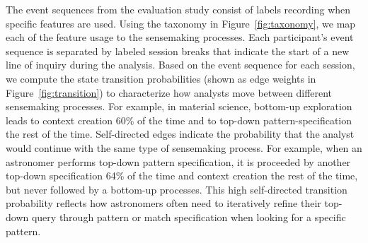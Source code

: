 \par The event sequences from the evaluation study consist of labels recording when specific features are used. Using the taxonomy in Figure~\ref{fig:taxonomy}, we map each of the feature usage to the sensemaking processes. Each participant's event sequence is separated by labeled session breaks that indicate the start of a new line of inquiry during the analysis. Based on the event sequence for each session, we compute the state transition probabilities (shown as edge weights in Figure~\ref{fig:transition}) to characterize how analysts move between different sensemaking processes. For example, in material science, bottom-up exploration leads to context creation 60\% of the time and to top-down pattern-specification the rest of the time. Self-directed edges indicate the probability that the analyst would continue with the same type of sensemaking process. For example, when an astronomer performs top-down pattern specification, it is proceeded by another top-down specification 64\% of the time and context creation the rest of the time, but never followed by a bottom-up processes. This high self-directed transition probability reflects how astronomers often need to iteratively refine their top-down query through pattern or match specification when looking for a specific pattern. %
